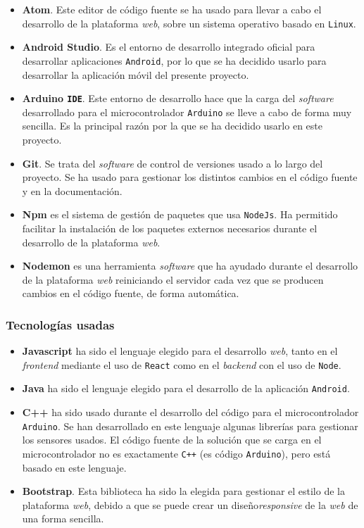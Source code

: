 \begin{itemize}
\item \textbf{Atom}. Este editor de código fuente se ha usado para llevar a cabo el desarrollo de la plataforma \textit{web}, sobre un sistema operativo basado en \texttt{Linux}.
\item \textbf{Android Studio}. Es el entorno de desarrollo integrado oficial para desarrollar aplicaciones \texttt{Android}, por lo que se ha decidido usarlo para desarrollar la aplicación móvil del presente proyecto.
\item \textbf{Arduino \texttt{IDE}}. Este entorno de desarrollo hace que la carga del \textit{software} desarrollado para el microcontrolador \texttt{Arduino} se lleve a cabo de forma muy sencilla. Es la principal razón por la que se ha decidido usarlo en este proyecto.
\item \textbf{Git}. Se trata del \textit{software} de control de versiones usado a lo largo del proyecto. Se ha usado para gestionar los distintos cambios en el código fuente y en la documentación.
\item \textbf{Npm} es el sistema de gestión de paquetes que usa \texttt{NodeJs}. Ha permitido facilitar la instalación de los paquetes externos necesarios durante el desarrollo de la plataforma \textit{web}.
\item \textbf{Nodemon} es una herramienta \textit{software} que ha ayudado durante el desarrollo de la plataforma \textit{web} reiniciando el servidor cada vez que se producen cambios en el código fuente, de forma automática.
\end{itemize}

\subsubsection{Tecnologías usadas}

\begin{itemize}
\item \textbf{Javascript} ha sido el lenguaje elegido para el desarrollo \textit{web}, tanto en el \textit{frontend} mediante el uso de \texttt{React} como en el \textit{backend} con el uso de \texttt{Node}.
\item \textbf{Java} ha sido el lenguaje elegido para el desarrollo de la aplicación \texttt{Android}.
\item \textbf{C++} ha sido usado durante el desarrollo del código para el microcontrolador \texttt{Arduino}. Se han desarrollado en este lenguaje algunas librerías para gestionar los sensores usados. El código fuente de la solución que se carga en el microcontrolador no es exactamente \texttt{C++} (es código \texttt{Arduino}), pero está basado en este lenguaje.
\item \textbf{Bootstrap}. Esta biblioteca ha sido la elegida para gestionar el estilo de la plataforma \textit{web}, debido a que se puede crear un diseño\textit{responsive} de la \textit{web} de una forma sencilla.
\end{itemize}

